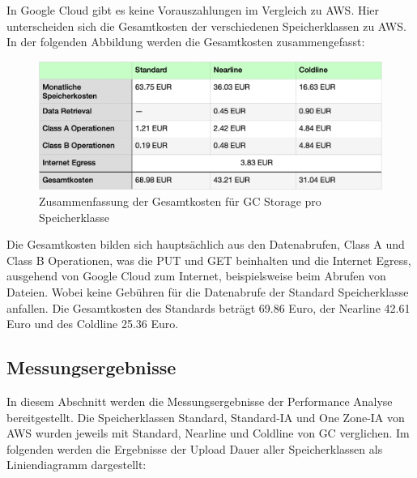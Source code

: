 \newpage        

In Google Cloud gibt es keine Vorauszahlungen im Vergleich zu AWS. Hier unterscheiden sich die Gesamtkosten der verschiedenen Speicherklassen zu AWS. In der folgenden Abbildung werden die Gesamtkosten zusammengefasst:

\begin{figure}[h]
	\centering
	\includegraphics[width=13cm,keepaspectratio]{Pictures/GCgesamtkosten.png}
	\caption{Zusammenfassung der Gesamtkosten für GC Storage pro Speicherklasse}
\end{figure}

Die Gesamtkosten bilden sich hauptsächlich aus den Datenabrufen, Class A und Class B Operationen, was die PUT und GET beinhalten und die Internet Egress, ausgehend von Google Cloud zum Internet, beispielsweise beim Abrufen von Dateien. Wobei keine Gebühren für die Datenabrufe der Standard Speicherklasse anfallen. Die Gesamtkosten des Standards beträgt 69.86 Euro, der Nearline 42.61 Euro und des Coldline 25.36 Euro. 

\newpage
\subsection{Messungsergebnisse}

In diesem Abschnitt werden die Messungsergebnisse der Performance Analyse bereitgestellt. Die Speicherklassen Standard, Standard-IA und One Zone-IA von AWS wurden jeweils mit Standard, Nearline und Coldline von GC verglichen. Im folgenden werden die Ergebnisse der Upload Dauer aller Speicherklassen als Liniendiagramm dargestellt:

